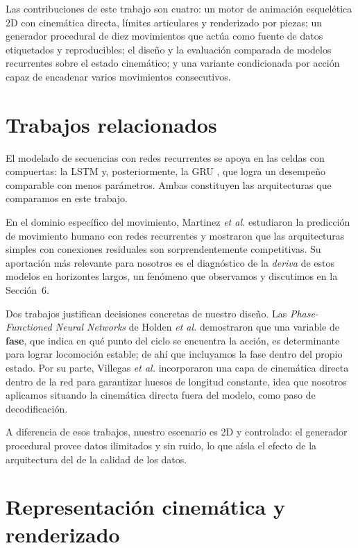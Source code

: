 \documentclass[10pt,twocolumn]{article}
\begin{document}
Las contribuciones de este trabajo son cuatro: un motor de animación esquelética
2D con cinemática directa, límites articulares y renderizado por piezas; un
generador procedural de diez movimientos que actúa como fuente de datos
etiquetados y reproducibles; el diseño y la evaluación comparada de modelos
recurrentes sobre el estado cinemático; y una variante condicionada por acción
capaz de encadenar varios movimientos consecutivos.

\section{Trabajos relacionados}
El modelado de secuencias con redes recurrentes se apoya en las celdas con
compuertas: la LSTM \cite{lstm} y, posteriormente, la GRU \cite{gru}, que logra un
desempeño comparable con menos parámetros. Ambas constituyen las arquitecturas
que comparamos en este trabajo.

En el dominio específico del movimiento, Martinez \emph{et al.} \cite{martinez}
estudiaron la predicción de movimiento humano con redes recurrentes y mostraron
que las arquitecturas simples con conexiones residuales son sorprendentemente
competitivas. Su aportación más relevante para nosotros es el diagnóstico de la
\emph{deriva} de estos modelos en horizontes largos, un fenómeno que observamos y
discutimos en la Sección~6.

Dos trabajos justifican decisiones concretas de nuestro diseño. Las
\emph{Phase-Functioned Neural Networks} de Holden \emph{et al.} \cite{pfnn}
demostraron que una variable de \textbf{fase}, que indica en qué punto del ciclo
se encuentra la acción, es determinante para lograr locomoción estable; de ahí
que incluyamos la fase dentro del propio estado. Por su parte, Villegas
\emph{et al.} \cite{nkn} incorporaron una capa de cinemática directa dentro de la
red para garantizar huesos de longitud constante, idea que nosotros aplicamos
situando la cinemática directa fuera del modelo, como paso de decodificación.

A diferencia de esos trabajos, nuestro escenario es 2D y controlado: el generador
procedural provee datos ilimitados y sin ruido, lo que aísla el efecto de la
arquitectura del de la calidad de los datos.

\section{Representación cinemática y renderizado}
\end{document}
